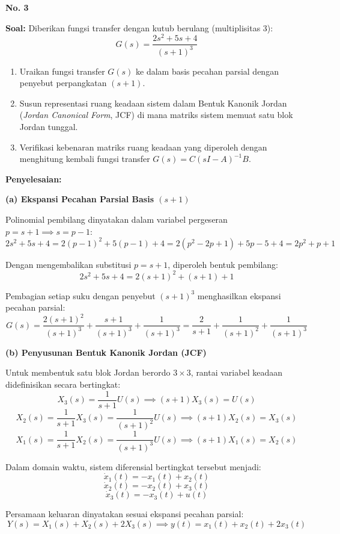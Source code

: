 \documentclass[11pt,a4paper]{article}
\begin{document}
\textbf{\large No. 3}

\textbf{Soal:}  
Diberikan fungsi transfer dengan kutub berulang (multiplisitas 3):
$$G(s) = \frac{2s^2 + 5s + 4}{(s+1)^3}$$
\begin{enumerate}[label=(\alph*)]
    \item Uraikan fungsi transfer $G(s)$ ke dalam basis pecahan parsial dengan penyebut perpangkatan $(s+1)$.
    \item Susun representasi ruang keadaan sistem dalam Bentuk Kanonik Jordan (\textit{Jordan Canonical Form}, JCF) di mana matriks sistem memuat satu blok Jordan tunggal.
    \item Verifikasi kebenaran matriks ruang keadaan yang diperoleh dengan menghitung kembali fungsi transfer $G(s) = C(sI - A)^{-1} B$.
\end{enumerate}

\textbf{Penyelesaian:}

\textbf{(a) Ekspansi Pecahan Parsial Basis $(s+1)$}

Polinomial pembilang dinyatakan dalam variabel pergeseran $p = s + 1 \implies s = p - 1$:
$$2s^2 + 5s + 4 = 2(p - 1)^2 + 5(p - 1) + 4 = 2(p^2 - 2p + 1) + 5p - 5 + 4 = 2p^2 + p + 1$$

Dengan mengembalikan substitusi $p = s + 1$, diperoleh bentuk pembilang:
$$2s^2 + 5s + 4 = 2(s+1)^2 + (s+1) + 1$$

Pembagian setiap suku dengan penyebut $(s+1)^3$ menghasilkan ekspansi pecahan parsial:
$$G(s) = \frac{2(s+1)^2}{(s+1)^3} + \frac{s+1}{(s+1)^3} + \frac{1}{(s+1)^3} = \frac{2}{s+1} + \frac{1}{(s+1)^2} + \frac{1}{(s+1)^3}$$

\textbf{(b) Penyusunan Bentuk Kanonik Jordan (JCF)}

Untuk membentuk satu blok Jordan berordo $3 \times 3$, rantai variabel keadaan didefinisikan secara bertingkat:
$$X_3(s) = \frac{1}{s+1} U(s) \implies (s+1) X_3(s) = U(s)$$
$$X_2(s) = \frac{1}{s+1} X_3(s) = \frac{1}{(s+1)^2} U(s) \implies (s+1) X_2(s) = X_3(s)$$
$$X_1(s) = \frac{1}{s+1} X_2(s) = \frac{1}{(s+1)^3} U(s) \implies (s+1) X_1(s) = X_2(s)$$

Dalam domain waktu, sistem diferensial bertingkat tersebut menjadi:
$$\dot{x}_1(t) = -x_1(t) + x_2(t)$$
$$\dot{x}_2(t) = -x_2(t) + x_3(t)$$
$$\dot{x}_3(t) = -x_3(t) + u(t)$$

Persamaan keluaran dinyatakan sesuai ekspansi pecahan parsial:
$$Y(s) = X_1(s) + X_2(s) + 2X_3(s) \implies y(t) = x_1(t) + x_2(t) + 2x_3(t)$$
\end{document}
